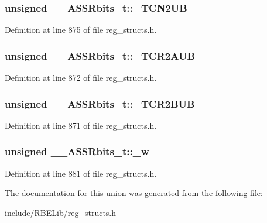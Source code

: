 \hypertarget{union_____a_s_s_rbits__t_a3182814a066ec1dc40261a56175dcb5c}{
\subsubsection[{\+\_\+\+T\+C\+N2\+U\+B}]{\setlength{\rightskip}{0pt plus 5cm}unsigned \+\_\+\+\_\+\+A\+S\+S\+Rbits\+\_\+t\+::\+\_\+\+T\+C\+N2\+U\+B}}\label{union_____a_s_s_rbits__t_a3182814a066ec1dc40261a56175dcb5c}


Definition at line 875 of file reg\+\_\+structs.\+h.

\hypertarget{union_____a_s_s_rbits__t_a895ad7948b94b952ba633dab59b471ec}{
\subsubsection[{\+\_\+\+T\+C\+R2\+A\+U\+B}]{\setlength{\rightskip}{0pt plus 5cm}unsigned \+\_\+\+\_\+\+A\+S\+S\+Rbits\+\_\+t\+::\+\_\+\+T\+C\+R2\+A\+U\+B}}\label{union_____a_s_s_rbits__t_a895ad7948b94b952ba633dab59b471ec}


Definition at line 872 of file reg\+\_\+structs.\+h.

\hypertarget{union_____a_s_s_rbits__t_abbc512d6ddaa410e946c079905bcabf6}{
\subsubsection[{\+\_\+\+T\+C\+R2\+B\+U\+B}]{\setlength{\rightskip}{0pt plus 5cm}unsigned \+\_\+\+\_\+\+A\+S\+S\+Rbits\+\_\+t\+::\+\_\+\+T\+C\+R2\+B\+U\+B}}\label{union_____a_s_s_rbits__t_abbc512d6ddaa410e946c079905bcabf6}


Definition at line 871 of file reg\+\_\+structs.\+h.

\hypertarget{union_____a_s_s_rbits__t_a2251e5d1ea8343c04f72799bcbce3c35}{
\subsubsection[{\+\_\+w}]{\setlength{\rightskip}{0pt plus 5cm}unsigned \+\_\+\+\_\+\+A\+S\+S\+Rbits\+\_\+t\+::\+\_\+w}}\label{union_____a_s_s_rbits__t_a2251e5d1ea8343c04f72799bcbce3c35}


Definition at line 881 of file reg\+\_\+structs.\+h.



The documentation for this union was generated from the following file\+:\begin{DoxyCompactItemize}
\item 
include/\+R\+B\+E\+Lib/\hyperlink{reg__structs_8h}{reg\+\_\+structs.\+h}\end{DoxyCompactItemize}
